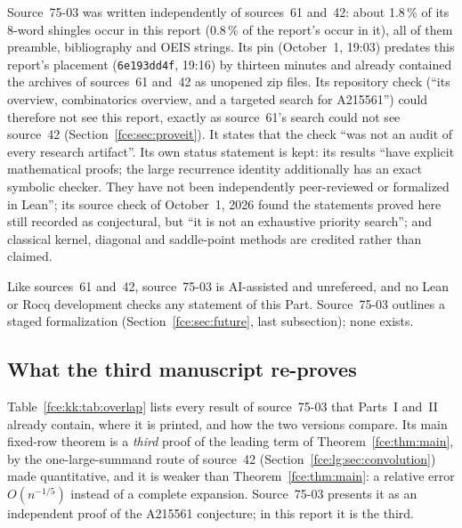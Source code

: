 \documentclass[11pt,a4paper]{article}
\numberwithin{equation}{section}
\theoremstyle{definition}\newtheorem{definition}[theorem]{Definition}
\theoremstyle{remark}\newtheorem{remark}[theorem]{Remark}
\begin{document}
Source~75-03 was written independently of sources~61 and~42: about
1.8\,\% of its 8-word shingles occur in this report (0.8\,\% of the report's
occur in it), all of them preamble, bibliography and OEIS strings. Its pin
(October~1, 19:03) predates this report's placement (\texttt{6e193dd4f},
19:16) by thirteen minutes and already contained the archives of
sources~61 and~42 as unopened zip files. Its repository check (``its
overview, combinatorics overview, and a targeted search for A215561'') could
therefore not see this report, exactly as source~61's search could not see
source~42 (Section~\ref{fce:sec:proveit}). It states that the check ``was not
an audit of every research artifact''. Its own status statement is kept:
its results ``have explicit mathematical proofs; the large recurrence
identity additionally has an exact symbolic checker. They have not been
independently peer-reviewed or formalized in Lean''; its source check of
October~1, 2026 found the statements proved here still recorded as
conjectural, but ``it is not an exhaustive priority search''; and classical
kernel, diagonal and saddle-point methods are credited rather than claimed.

Like sources~61 and~42, source~75-03 is AI-assisted and unrefereed, and no
Lean or Rocq development checks any statement of this Part. Source~75-03
outlines a staged formalization (Section~\ref{fce:sec:future}, last
subsection); none exists.

\subsection{What the third manuscript re-proves}\label{fce:kk:sec:overlap}
Table~\ref{fce:kk:tab:overlap} lists every result of source~75-03 that
Parts~I and~II already contain, where it is printed, and how the two
versions compare. Its main fixed-row theorem is a \emph{third} proof of the
leading term of Theorem~\ref{fce:thm:main}, by the one-large-summand route
of source~42 (Section~\ref{fce:lg:sec:convolution}) made quantitative, and
it is weaker than Theorem~\ref{fce:thm:main}: a relative error
$O(n^{-1/5})$ instead of a complete expansion. Source~75-03 presents it as
an independent proof of the A215561 conjecture; in this report it is the
third.
\end{document}

